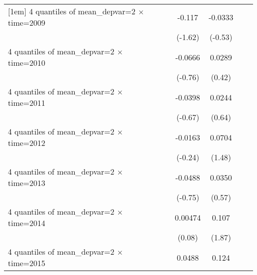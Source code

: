 \begin{table}[htbp]
\begin{tabular}{l*{6}{c}}
[1em]
4 quantiles of mean\_depvar=2 $\times$ time=2009&                     &                     &      -0.117         &     -0.0333         &                     &                     \\
                    &                     &                     &     (-1.62)         &     (-0.53)         &                     &                     \\
[1em]
4 quantiles of mean\_depvar=2 $\times$ time=2010&                     &                     &     -0.0666         &      0.0289         &                     &                     \\
                    &                     &                     &     (-0.76)         &      (0.42)         &                     &                     \\
[1em]
4 quantiles of mean\_depvar=2 $\times$ time=2011&                     &                     &     -0.0398         &      0.0244         &                     &                     \\
                    &                     &                     &     (-0.67)         &      (0.64)         &                     &                     \\
[1em]
4 quantiles of mean\_depvar=2 $\times$ time=2012&                     &                     &     -0.0163         &      0.0704         &                     &                     \\
                    &                     &                     &     (-0.24)         &      (1.48)         &                     &                     \\
[1em]
4 quantiles of mean\_depvar=2 $\times$ time=2013&                     &                     &     -0.0488         &      0.0350         &                     &                     \\
                    &                     &                     &     (-0.75)         &      (0.57)         &                     &                     \\
[1em]
4 quantiles of mean\_depvar=2 $\times$ time=2014&                     &                     &     0.00474         &       0.107\sym{*}  &                     &                     \\
                    &                     &                     &      (0.08)         &      (1.87)         &                     &                     \\
[1em]
4 quantiles of mean\_depvar=2 $\times$ time=2015&                     &                     &      0.0488         &       0.124\sym{*}  &                     &                     \\

\end{tabular}
\end{table}
